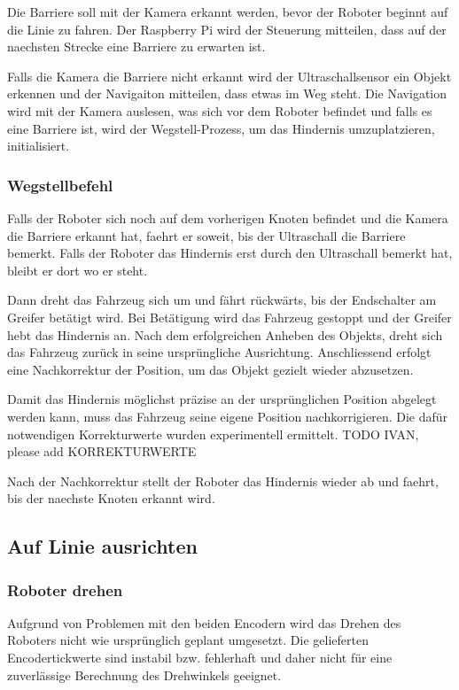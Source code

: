 Die Barriere soll mit der Kamera erkannt werden, bevor der Roboter beginnt auf die Linie zu fahren. Der Raspberry Pi wird der Steuerung mitteilen, dass auf der naechsten Strecke eine Barriere zu erwarten ist.

Falls die Kamera die Barriere nicht erkannt wird der Ultraschallsensor ein Objekt erkennen und der Navigaiton mitteilen, dass etwas im Weg steht. Die Navigation wird mit der Kamera auslesen, was sich vor dem Roboter befindet und falls es eine Barriere ist, wird der Wegstell-Prozess, um das Hindernis umzuplatzieren, initialisiert.

\subsubsection{Wegstellbefehl}

Falls der Roboter sich noch auf dem vorherigen Knoten befindet und die Kamera die Barriere erkannt hat, faehrt er soweit, bis der Ultraschall die Barriere bemerkt. Falls der Roboter das Hindernis erst durch den Ultraschall bemerkt hat, bleibt er dort wo er steht.

Dann dreht das Fahrzeug sich um und fährt rückwärts, bis der Endschalter am Greifer betätigt wird. Bei Betätigung wird das Fahrzeug gestoppt und der Greifer hebt das Hindernis an.
Nach dem erfolgreichen Anheben des Objekts, dreht sich das Fahrzeug zurück in seine ursprüngliche Ausrichtung. Anschliessend erfolgt eine Nachkorrektur der Position, um das Objekt gezielt wieder abzusetzen.

Damit das Hindernis möglichst präzise an der ursprünglichen Position abgelegt werden kann, muss das Fahrzeug seine eigene Position nachkorrigieren. Die dafür notwendigen Korrekturwerte wurden experimentell ermittelt. TODO IVAN, please add KORREKTURWERTE

Nach der Nachkorrektur stellt der Roboter das Hindernis wieder ab und faehrt, bis der naechste Knoten erkannt wird.


\newpage
\subsection{Auf Linie ausrichten}

\subsubsection{Roboter drehen}

Aufgrund von Problemen mit den beiden Encodern wird das Drehen des Roboters nicht wie ursprünglich geplant umgesetzt. Die gelieferten Encodertickwerte sind instabil bzw. fehlerhaft und daher nicht für eine zuverlässige Berechnung des Drehwinkels geeignet. 

